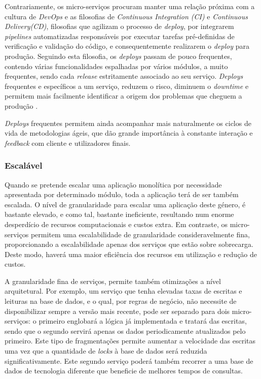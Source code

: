     
        Contrariamente, os micro-serviços procuram manter uma relação próxima com a cultura de \textit{DevOps} e as filosofias de \textit{Continuous Integration (CI)} e \textit{Continuous Delivery(CD)}, filosofias que agilizam o processo de \textit{deploy}, por integrarem \textit{pipelines} automatizadas responsáveis por executar tarefas pré-definidas de verificação e validação do código, e consequentemente realizarem o \textit{deploy} para produção. Seguindo esta filosofia, os \textit{deploys} passam de pouco frequentes, contendo várias funcionalidades espalhadas por vários módulos, a muito frequentes, sendo cada \textit{release} estritamente associado ao seu serviço. \textit{Deploys} frequentes e específicos a um serviço, reduzem o risco, diminuem o \textit{downtime} e permitem mais facilmente identificar a origem dos problemas que cheguem a produção \citep{newman2015microservices}.
    
        \textit{Deploys} frequentes permitem ainda acompanhar mais naturalmente os ciclos de vida de metodologias ágeis, que dão grande importância à constante interação e \textit{feedback} com cliente e utilizadores finais. 
    
    
    \subsubsection*{Escalável}
       
       Quando se pretende escalar uma aplicação monolítica por necessidade apresentada por determinado módulo, toda a aplicação terá de ser também escalada. O nível de granularidade para escalar uma aplicação deste género, é bastante elevado, e como tal, bastante ineficiente, resultando num enorme desperdício de recursos computacionais e custos extra. Em contraste, os micro-serviços permitem uma escalabilidade de granularidade consideravelmente fina, proporcionando a escalabilidade apenas dos serviços que estão sobre sobrecarga. Deste modo, haverá uma maior eficiência dos recursos em utilização e redução de custos.
       
       A granularidade fina de serviços, permite também otimizações a nível arquitetural. Por exemplo, um serviço que tenha elevadas taxas de escritas e leituras na base de dados, e o qual, por regras de negócio, não necessite de disponibilizar sempre a versão mais recente, pode ser separado para dois micro-serviços: o primeiro englobará a lógica já implementada e tratará das escritas, sendo que o segundo servirá apenas os dados periodicamente atualizados pelo primeiro. Este tipo de fragmentações permite aumentar a velocidade das escritas uma vez que a quantidade de \textit{locks} à base de dados será reduzida significativamente. Este segundo serviço poderá também recorrer a uma base de dados de tecnologia diferente que beneficie de melhores tempos de consultas.
       
